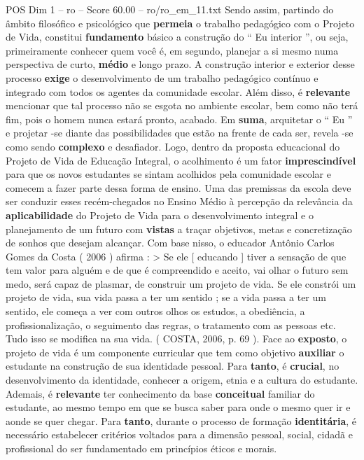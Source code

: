 \begin{textsample}{POS Dim 1 – ro – Score 60.00 – ro/ro\_em\_11.txt}
Sendo assim, partindo do âmbito filosófico e psicológico que \textbf{permeia} o trabalho pedagógico com o Projeto de Vida, constitui \textbf{fundamento} básico a construção do “ Eu interior ”, ou seja, primeiramente conhecer quem você é, em segundo, planejar a si mesmo numa perspectiva de curto, \textbf{médio} e longo prazo.
A construção interior e exterior desse processo \textbf{exige} o desenvolvimento de um trabalho pedagógico contínuo e integrado com todos os agentes da comunidade escolar.
Além disso, é \textbf{relevante} mencionar que tal processo não se esgota no ambiente escolar, bem como não terá fim, pois o homem nunca estará pronto, acabado.
Em \textbf{suma}, arquitetar o “ Eu ” e projetar -se diante das possibilidades que estão na frente de cada ser, revela -se como sendo \textbf{complexo} e desafiador.
Logo, dentro da proposta educacional do Projeto de Vida de Educação Integral, o acolhimento é um fator \textbf{imprescindível} para que os novos estudantes se sintam acolhidos pela comunidade escolar e comecem a fazer parte dessa forma de ensino.
Uma das premissas da escola deve ser conduzir esses recém-chegados no Ensino Médio à percepção da relevância da \textbf{aplicabilidade} do Projeto de Vida para o desenvolvimento integral e o planejamento de um futuro com \textbf{vistas} a traçar objetivos, metas e concretização de sonhos que desejam alcançar.
Com base nisso, o educador Antônio Carlos Gomes da Costa ( 2006 ) afirma : > Se ele [ educando ] tiver a sensação de que tem valor para alguém e de que é compreendido e aceito, vai olhar o futuro sem medo, será capaz de plasmar, de construir um projeto de vida.
Se ele constrói um projeto de vida, sua vida passa a ter um sentido ; se a vida passa a ter um sentido, ele começa a ver com outros olhos os estudos, a obediência, a profissionalização, o seguimento das regras, o tratamento com as pessoas etc.
Tudo isso se modifica na sua vida. ( COSTA, 2006, p. 69 ).
Face ao \textbf{exposto}, o projeto de vida é um componente curricular que tem como objetivo \textbf{auxiliar} o estudante na construção de sua identidade pessoal.
Para \textbf{tanto}, é \textbf{crucial}, no desenvolvimento da identidade, conhecer a origem, etnia e a cultura do estudante.
Ademais, é \textbf{relevante} ter conhecimento da base \textbf{conceitual} familiar do estudante, ao mesmo tempo em que se busca saber para onde o mesmo quer ir e aonde se quer chegar.
Para \textbf{tanto}, durante o processo de formação \textbf{identitária}, é necessário estabelecer critérios voltados para a dimensão pessoal, social, cidadã e profissional do ser fundamentado em princípios éticos e morais.

\end{textsample}
